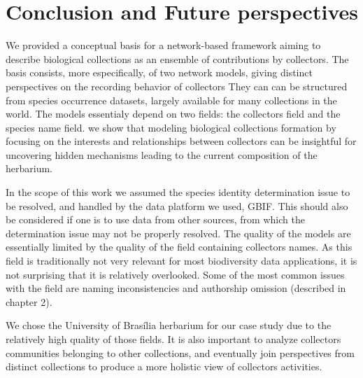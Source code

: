 \chapter{Conclusion and Future perspectives}\label{conclusion_perspectives}


We provided a conceptual basis for a network-based framework aiming to describe biological collections as an ensemble of contributions by collectors.
The basis consists, more especifically, of two network models, giving distinct perspectives on the recording behavior of collectors
They can can be structured from species occurrence datasets, largely available for many collections in the world.
The models essentialy depend on two fields: the collectors field and the species name field.
we show that modeling biological collections formation by focusing on the interests and relationships between collectors can be insightful for uncovering hidden mechanisms leading to the current composition of the herbarium. 

In the scope of this work we assumed the species identity determination issue to be resolved, and handled by the data platform we used, GBIF. 
This should also be considered if one is to use data from other sources, from which the determination issue may not be properly resolved.
The quality of the models are essentially limited by the quality of the field containing collectors names.
As this field is traditionally not very relevant for most biodiversity data applications, it is not surprising that it is relatively overlooked.
Some of the most common issues with the field are naming inconsistencies and authorship omission (described in chapter 2).

We chose the University of Brasília herbarium for our case study due to the relatively high quality of those fields.
It is also important to analyze collectors communities belonging to other collections, and eventually join perspectives from distinct collections to produce a more holistic view of collectors activities.




